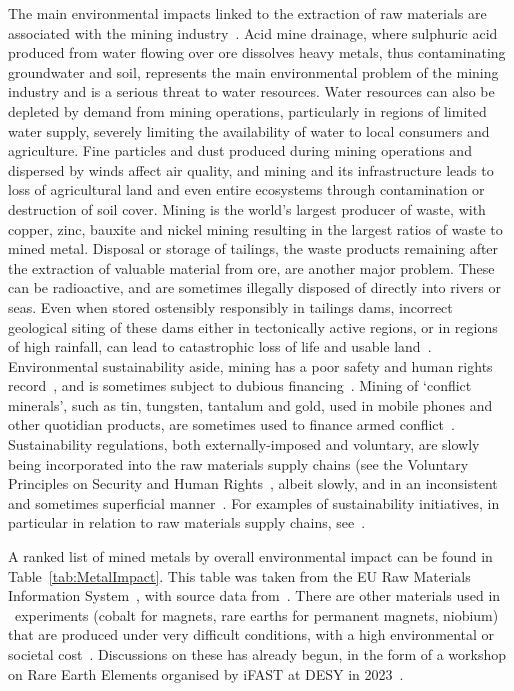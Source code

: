 \documentclass[../SustainableHEP.tex]{subfiles}
\begin{document}
The main environmental impacts linked to the extraction of raw materials are associated with the mining industry~\cite{Dolega:2016}.  Acid mine drainage, where sulphuric acid produced from water flowing over ore dissolves heavy metals, thus contaminating groundwater and soil, represents the main environmental problem of the mining industry and is a serious threat to water resources.  Water resources can also be depleted by demand from mining operations, particularly in regions of limited water supply, severely limiting the availability of water to local consumers and agriculture.  Fine particles and dust produced during mining operations and dispersed by winds affect air quality, and mining and its infrastructure leads to loss of agricultural land and even entire ecosystems through contamination or destruction of soil cover. Mining is the world's largest producer of waste, with copper, zinc, bauxite and nickel mining resulting in the largest ratios of waste to mined metal.  Disposal or storage of tailings, the waste products remaining after the extraction of valuable material from ore, are another major problem. These can be radioactive, and are sometimes illegally disposed of directly into rivers or seas.  Even when stored ostensibly responsibly in tailings dams, incorrect geological siting of these dams either in tectonically active regions, or in regions of high rainfall, can lead to catastrophic loss of life and usable land~\cite{SILVAROTTA2020102119}.    Environmental sustainability aside, mining has a poor safety and human rights record~\cite{ResponsibleMiningIndex}, and is sometimes subject to dubious financing~\cite{MiningandMoneyLaundering}.  Mining of `conflict minerals', such as tin, tungsten, tantalum and gold, used in mobile phones and other quotidian products, are sometimes used to finance armed conflict~\cite{EUConflictMinerals}.  Sustainability regulations, both externally-imposed and voluntary, are slowly being incorporated into the raw materials supply chains (see \eg the Voluntary Principles on Security and Human Rights~\cite{VoluntaryPrinciples}, albeit slowly, and in an inconsistent and sometimes superficial manner~\cite{ResponsibleMiningIndex,ResponsibleMiningFoundation}.  For examples of sustainability initiatives, in particular in relation to raw materials supply chains, see~.

A ranked list of mined metals by overall environmental impact can be found in Table~\ref{tab:MetalImpact}.  This table was taken from the EU Raw Materials Information System~\cite{EURMIS}, with source data from~\cite{UNEP2010}.  There are other materials used in \ACR\ experiments (\eg cobalt for magnets, rare earths for permanent magnets, niobium) that are produced under very difficult conditions, with a high environmental or societal cost~\cite{FARJANA2019150, EURare, ALVES2019275}.  Discussions on these has already begun, in the form of a workshop on Rare Earth Elements organised by iFAST at DESY in 2023~\cite{DESYRareEarth}.
\end{document}
